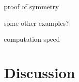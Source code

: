 \documentclass{egpubl}
\begin{document}
proof of symmetry

some other examples?

computation speed


\section{Discussion}


%
%
%
%



%
%
%
\end{document}
